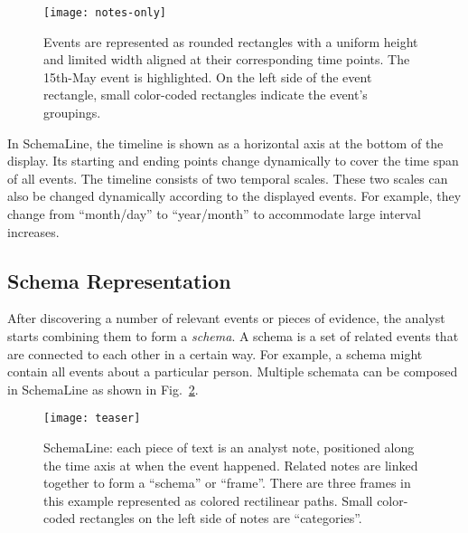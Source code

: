 \begin{figure}[ht]
\centering
\texttt{[image: notes-only]}
\caption{Events are represented as rounded rectangles with a uniform height and limited width aligned at their corresponding time points. The 15th-May event is highlighted. On the left side of the event rectangle, small color-coded rectangles indicate the event's groupings.}
\label{fig:notes-only}
\end{figure}

In SchemaLine, the timeline is shown as a horizontal axis at the bottom of the display. Its starting and ending points change dynamically to cover the time span of all events. The timeline consists of two temporal scales. These two scales can also be changed dynamically according to the displayed events. For example, they change from ``month/day'' to ``year/month'' to accommodate large interval increases.

\subsection{Schema Representation}
After discovering a number of relevant events or pieces of evidence, the analyst starts combining them to form a \textit{schema}. A schema is a set of related events that are connected to each other in a certain way. For example, a schema might contain all events about a particular person. Multiple schemata can be composed in SchemaLine as shown in Fig.~\ref{fig:teaser}. 

\begin{figure}[ht]
\centering
\texttt{[image: teaser]}
\caption{SchemaLine: each piece of text is an analyst note, positioned along the time axis at when the event happened. Related notes are linked together to form a ``schema'' or ``frame''. There are three frames in this example represented as colored rectilinear paths. Small color-coded rectangles on the left side of notes are ``categories''.}
\label{fig:teaser}
\end{figure}

